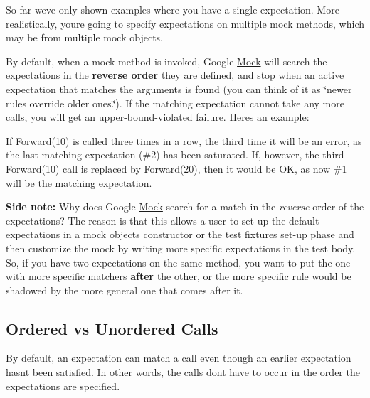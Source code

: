 So far we\textquotesingle{}ve only shown examples where you have a single expectation. More realistically, you\textquotesingle{}re going to specify expectations on multiple mock methods, which may be from multiple mock objects.

By default, when a mock method is invoked, Google \mbox{\hyperlink{class_mock}{Mock}} will search the expectations in the {\bfseries{reverse order}} they are defined, and stop when an active expectation that matches the arguments is found (you can think of it as \char`\"{}newer rules override older ones.\char`\"{}). If the matching expectation cannot take any more calls, you will get an upper-\/bound-\/violated failure. Here\textquotesingle{}s an example\+:


\begin{DoxyCode}{0}
\end{DoxyCode}


If {\ttfamily Forward(10)} is called three times in a row, the third time it will be an error, as the last matching expectation (\#2) has been saturated. If, however, the third {\ttfamily Forward(10)} call is replaced by {\ttfamily Forward(20)}, then it would be OK, as now \#1 will be the matching expectation.

{\bfseries{Side note\+:}} Why does Google \mbox{\hyperlink{class_mock}{Mock}} search for a match in the {\itshape reverse} order of the expectations? The reason is that this allows a user to set up the default expectations in a mock object\textquotesingle{}s constructor or the test fixture\textquotesingle{}s set-\/up phase and then customize the mock by writing more specific expectations in the test body. So, if you have two expectations on the same method, you want to put the one with more specific matchers {\bfseries{after}} the other, or the more specific rule would be shadowed by the more general one that comes after it.

\subsection*{Ordered vs Unordered Calls}

By default, an expectation can match a call even though an earlier expectation hasn\textquotesingle{}t been satisfied. In other words, the calls don\textquotesingle{}t have to occur in the order the expectations are specified.

